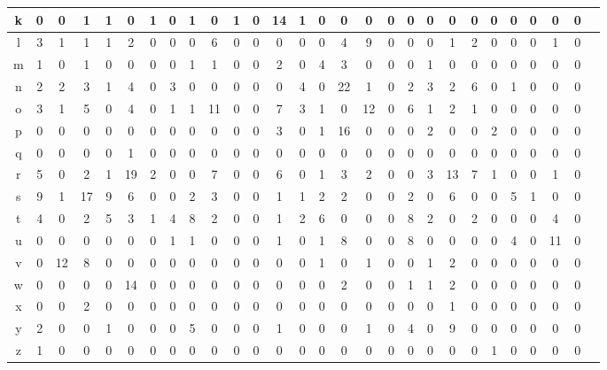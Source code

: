 {\begin{table*}[!h]
\begin{center}
\begin{tabular}{|c|c|c|c|c|c|c|c|c|c|c|c|c|c|c|c|c|c|c|c|c|c|c|c|c|c|c|c|}
k & 0 & 0 & 1 & 1 & 0 & 1 & 0 & 1 & 0 & 1 & 0 & 14 & 1 & 0 & 0 & 0 & 0 & 0 & 0 & 0 & 0 & 0 & 0 & 0 & 0 & 0 \\ \hline
l & 3 & 1 & 1 & 1 & 2 & 0 & 0 & 0 & 6 & 0 & 0 & 0 & 0 & 0 & 4 & 9 & 0 & 0 & 0 & 1 & 2 & 0 & 0 & 0 & 1 & 0 \\ \hline
m & 1 & 0 & 1 & 0 & 0 & 0 & 0 & 1 & 1 & 0 & 0 & 2 & 0 & 4 & 3 & 0 & 0 & 0 & 1 & 0 & 0 & 0 & 0 & 0 & 0 & 0 \\ \hline
n & 2 & 2 & 3 & 1 & 4 & 0 & 3 & 0 & 0 & 0 & 0 & 0 & 4 & 0 & 22 & 1 & 0 & 2 & 3 & 2 & 6 & 0 & 1 & 0 & 0 & 0 \\ \hline
o & 3 & 1 & 5 & 0 & 4 & 0 & 1 & 1 & 11 & 0 & 0 & 7 & 3 & 1 & 0 & 12 & 0 & 6 & 1 & 2 & 1 & 0 & 0 & 0 & 0 & 0 \\ \hline
p & 0 & 0 & 0 & 0 & 0 & 0 & 0 & 0 & 0 & 0 & 0 & 3 & 0 & 1 & 16 & 0 & 0 & 0 & 2 & 0 & 0 & 2 & 0 & 0 & 0 & 0 \\ \hline
q & 0 & 0 & 0 & 0 & 1 & 0 & 0 & 0 & 0 & 0 & 0 & 0 & 0 & 0 & 0 & 0 & 0 & 0 & 0 & 0 & 0 & 0 & 0 & 0 & 0 & 0 \\ \hline
r & 5 & 0 & 2 & 1 & 19 & 2 & 0 & 0 & 7 & 0 & 0 & 6 & 0 & 1 & 3 & 2 & 0 & 0 & 3 & 13 & 7 & 1 & 0 & 0 & 1 & 0 \\ \hline
s & 9 & 1 & 17 & 9 & 6 & 0 & 0 & 2 & 3 & 0 & 0 & 1 & 1 & 2 & 2 & 0 & 0 & 2 & 0 & 6 & 0 & 0 & 5 & 1 & 0 & 0 \\ \hline
t & 4 & 0 & 2 & 5 & 3 & 1 & 4 & 8 & 2 & 0 & 0 & 1 & 2 & 6 & 0 & 0 & 0 & 8 & 2 & 0 & 2 & 0 & 0 & 0 & 4 & 0 \\ \hline
u & 0 & 0 & 0 & 0 & 0 & 0 & 1 & 1 & 0 & 0 & 0 & 1 & 0 & 1 & 8 & 0 & 0 & 8 & 0 & 0 & 0 & 0 & 4 & 0 & 11 & 0 \\ \hline
v & 0 & 12 & 8 & 0 & 0 & 0 & 0 & 0 & 0 & 0 & 0 & 0 & 0 & 1 & 0 & 1 & 0 & 0 & 1 & 2 & 0 & 0 & 0 & 0 & 0 & 0 \\ \hline
w & 0 & 0 & 0 & 0 & 14 & 0 & 0 & 0 & 0 & 0 & 0 & 0 & 0 & 0 & 2 & 0 & 0 & 1 & 1 & 2 & 0 & 0 & 0 & 0 & 0 & 0 \\ \hline
x & 0 & 0 & 2 & 0 & 0 & 0 & 0 & 0 & 0 & 0 & 0 & 0 & 0 & 0 & 0 & 0 & 0 & 0 & 0 & 1 & 0 & 0 & 0 & 0 & 0 & 0 \\ \hline
y & 2 & 0 & 0 & 1 & 0 & 0 & 0 & 5 & 0 & 0 & 0 & 1 & 0 & 0 & 0 & 1 & 0 & 4 & 0 & 9 & 0 & 0 & 0 & 0 & 0 & 0 \\ \hline
z & 1 & 0 & 0 & 0 & 0 & 0 & 0 & 0 & 0 & 0 & 0 & 0 & 0 & 0 & 0 & 0 & 0 & 0 & 0 & 0 & 0 & 1 & 0 & 0 & 0 & 0 \\ \hline
   \end{tabular}
  \end{center}
 \end{table*}
}


